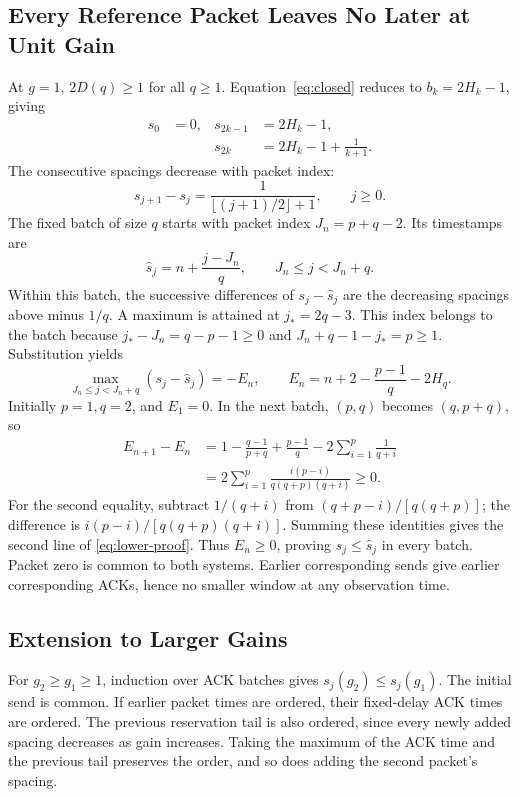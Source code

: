 \documentclass[sigconf,nonacm]{acmart}
\begin{document}
\subsection{Every Reference Packet Leaves No Later at Unit Gain}
At $g=1$, $2D(q)\ge1$ for all $q\ge1$. Equation~\eqref{eq:closed} reduces to $b_k=2H_k-1$, giving
\begin{align}
 s_0&=0, & s_{2k-1}&=2H_k-1,\nonumber\\
 &&s_{2k}&=2H_k-1+\frac1{k+1}.\label{eq:unit-send}
\end{align}
The consecutive spacings decrease with packet index:
\begin{equation}
 s_{j+1}-s_j=\frac1{\lfloor(j+1)/2\rfloor+1},\qquad j\ge0.
\end{equation}
The fixed batch of size $q$ starts with packet index $J_n=p+q-2$. Its timestamps are
\begin{equation}
 \widehat s_j=n+\frac{j-J_n}{q},\qquad J_n\le j<J_n+q.
\end{equation}
Within this batch, the successive differences of $s_j-\widehat s_j$ are the decreasing spacings above minus $1/q$. A maximum is attained at $j_*=2q-3$. This index belongs to the batch because $j_*-J_n=q-p-1\ge0$ and $J_n+q-1-j_*=p\ge1$. Substitution yields
\begin{equation}
 \max_{J_n\le j<J_n+q}(s_j-\widehat s_j)=-E_n,\qquad
 E_n=n+2-\frac{p-1}{q}-2H_q.
\end{equation}
Initially $p=1,q=2$, and $E_1=0$. In the next batch, $(p,q)$ becomes $(q,p+q)$, so
\begin{align}
 E_{n+1}-E_n
 &=1-\frac{q-1}{p+q}+\frac{p-1}{q}
       -2\sum_{i=1}^{p}\frac1{q+i}\nonumber\\
 &=2\sum_{i=1}^{p}\frac{i(p-i)}{q(q+p)(q+i)}\ge0.\label{eq:lower-proof}
\end{align}
For the second equality, subtract $1/(q+i)$ from $(q+p-i)/[q(q+p)]$; the difference is $i(p-i)/[q(q+p)(q+i)]$. Summing these identities gives the second line of \eqref{eq:lower-proof}. Thus $E_n\ge0$, proving $s_j\le\widehat s_j$ in every batch. Packet zero is common to both systems. Earlier corresponding sends give earlier corresponding ACKs, hence no smaller window at any observation time.

\subsection{Extension to Larger Gains}
For $g_2\ge g_1\ge1$, induction over ACK batches gives $s_j(g_2)\le s_j(g_1)$. The initial send is common. If earlier packet times are ordered, their fixed-delay ACK times are ordered. The previous reservation tail is also ordered, since every newly added spacing decreases as gain increases. Taking the maximum of the ACK time and the previous tail preserves the order, and so does adding the second packet's spacing.
\end{document}
